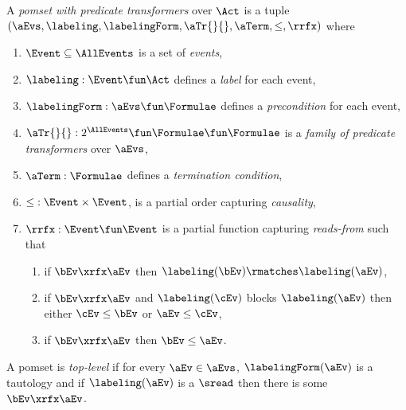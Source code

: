 \begin{definition}
  \label{def:pomset}
  A \emph{pomset with predicate transformers} over $\Act$
  is a tuple $(\aEvs, \labeling, \labelingForm, \aTr{}{}, \aTerm, {\le}, {\rrfx})$ where
  \begin{enumerate}[,label=(\textsc{m}\arabic*),ref=\textsc{m}\arabic*]
  \item \label{pom-E}
    $\Event\subseteq\AllEvents$ is a set of \emph{events},
  \item \label{pom-lambda}
    $\labeling: \Event \fun \Act$ defines a \emph{label} for each event,
  \item \label{pom-kappa}
    $\labelingForm:\aEvs\fun\Formulae$ defines a \emph{precondition} for each event,
  \item \label{pom-tau}
    $\aTr{}{}:2^{\AllEvents}\fun\Formulae \fun\Formulae$ is a \emph{family of
      predicate transformers} over $\aEvs$, %
  \item \label{pom-term}
    $\aTerm:\Formulae$ defines a \emph{termination condition},
  \item \label{pom-le}
    ${\le} : \Event\times\Event$, is a partial order capturing \emph{causality},
  \item \label{pom-rf}
    ${\rrfx} : \Event\fun\Event$ is a partial function capturing
    \emph{reads-from} such that 
    \begin{enumerate}
    \item \label{rf-match}
      if $\bEv\xrfx\aEv$ then $\labeling(\bEv) \rmatches \labeling(\aEv)$,
    \item \label{rf-block}
      if $\bEv\xrfx\aEv$ and $\labeling(\cEv)$ blocks $\labeling(\aEv)$ then either $\cEv\le\bEv$ or $\aEv\le\cEv$,
    \item \label{rf-le}
      if $\bEv\xrfx\aEv$ then $\bEv\le\aEv$.
    \end{enumerate}
  \end{enumerate}
\end{definition}

\begin{definition}
  A pomset is \emph{top-level} if for every $\aEv\in\aEvs$,
  $\labelingForm(\aEv)$ is a tautology and
  if $\labeling(\aEv)$ is a $\sread$ then there is some $\bEv\xrfx\aEv$.
\end{definition}

